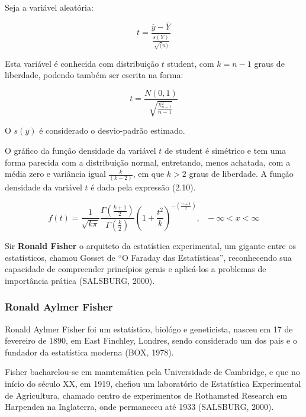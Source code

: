 Seja a variável aleatória:

\begin{equation}
    t =\frac{\overline{y}-\overline{Y}}{\frac{s(Y)}{\sqrt(n)}}
\end{equation}

Esta variável é conhecida com distribuição $t$ student, com $k=n-1$ graus de liberdade, podendo também ser escrita na forma:

\begin{equation}
    t =\frac{N(0,1)}{\sqrt{\frac{\chi^{2}_{n-1}}{n-1}}}
\end{equation}

O $s(y)$ é considerado o desvio-padrão estimado.\vskip0.3cm

O gráfico da função densidade da variável $t$ de student é simétrico e tem uma forma parecida com a distribuição normal, entretando, menos achatada, com a média zero e variância igual $\frac{k}{(k-2)}$, em que $k>2$ graus de liberdade. A função densidade da variável $t$ é dada pela expressão (2.10). 

\begin{equation}
f\left(t\right)=\frac{1}{\sqrt{k \pi}}\frac{\Gamma\left(\frac{k+1}{2}\right) }{\Gamma \left(\frac{k}{2}\right)}\left(1+\frac{t^2}{k}\right)^{-\left(\frac{\upsilon+1}{2}\right)},~~~-\infty<x<\infty
\end{equation}

Sir \textbf{Ronald Fisher} o arquiteto da estatística experimental, um gigante entre os estatísticos, chamou Gosset de “O Faraday das Estatísticas”, reconhecendo sua capacidade de compreender princípios gerais e aplicá-los a problemas de importância prática (SALSBURG, 2000).


\newpage
\subsubsection{Ronald Aylmer Fisher}

Ronald Aylmer Fisher foi um estatístico, biológo e geneticista, nasceu em 17 de fevereiro de 1890, em East Finchley, Londres, sendo considerado um dos pais e o fundador da estatística moderna (BOX, 1978).\vskip0.3cm


Fisher bacharelou-se em mamtemática pela Universidade de Cambridge, e que no início do século XX, em 1919, chefiou um laboratório de Estatística Experimental de Agricultura, chamado centro de experimentos de Rothamsted Research em Harpenden na Inglaterra, onde permaneceu até 1933 (SALSBURG, 2000).

